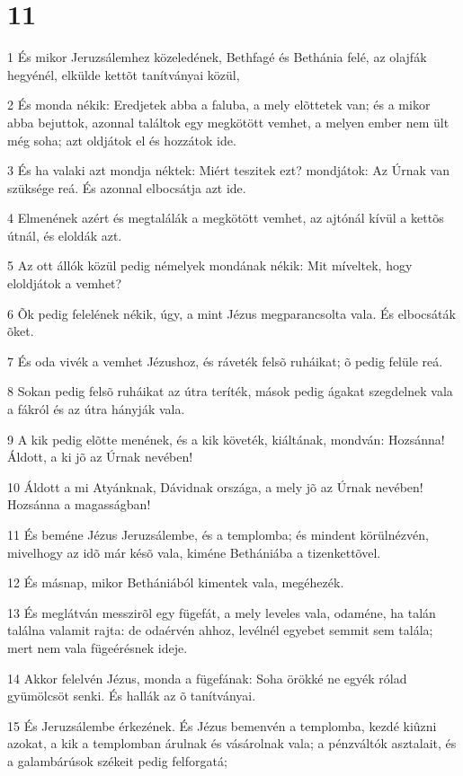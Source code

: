 \chapter{11}

\par 1 És mikor Jeruzsálemhez közeledének, Bethfagé és Bethánia felé, az olajfák hegyénél, elkülde kettõt tanítványai közül,
\par 2 És monda nékik: Eredjetek abba a faluba, a mely elõttetek van; és a mikor abba bejuttok, azonnal találtok egy megkötött vemhet, a melyen ember nem ült még soha; azt oldjátok el és hozzátok ide.
\par 3 És ha valaki azt mondja néktek: Miért teszitek ezt? mondjátok: Az Úrnak van szüksége reá. És azonnal elbocsátja azt ide.
\par 4 Elmenének azért és megtalálák a megkötött vemhet, az ajtónál kívül a kettõs útnál, és eloldák azt.
\par 5 Az ott állók közül pedig némelyek mondának nékik: Mit míveltek, hogy eloldjátok a vemhet?
\par 6 Õk pedig felelének nékik, úgy, a mint Jézus megparancsolta vala. És elbocsáták õket.
\par 7 És oda vivék a vemhet Jézushoz, és ráveték felsõ ruháikat; õ pedig felüle reá.
\par 8 Sokan pedig felsõ ruháikat az útra teríték, mások pedig ágakat szegdelnek vala a fákról és az útra hányják vala.
\par 9 A kik pedig elõtte menének, és a kik követék, kiáltának, mondván: Hozsánna! Áldott, a ki jõ az Úrnak nevében!
\par 10 Áldott a mi Atyánknak, Dávidnak országa, a mely jõ az Úrnak nevében! Hozsánna a magasságban!
\par 11 És beméne Jézus Jeruzsálembe, és a templomba; és mindent körülnézvén, mivelhogy az idõ már késõ vala, kiméne Bethániába a tizenkettõvel.
\par 12 És másnap, mikor Bethániából kimentek vala, megéhezék.
\par 13 És meglátván messzirõl egy fügefát, a mely leveles vala, odaméne, ha talán találna valamit rajta: de odaérvén ahhoz, levélnél egyebet semmit sem talála; mert nem vala fügeérésnek ideje.
\par 14 Akkor felelvén Jézus, monda a fügefának: Soha örökké ne egyék rólad gyümölcsöt senki. És hallák az õ tanítványai.
\par 15 És Jeruzsálembe érkezének. És Jézus bemenvén a templomba, kezdé kiûzni azokat, a kik a templomban árulnak és vásárolnak vala; a pénzváltók asztalait, és a galambárúsok székeit pedig felforgatá;
